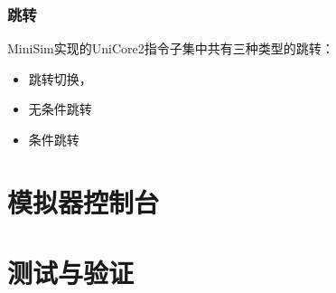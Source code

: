 \documentclass[12pt,a4paper,Flow]{report}
\begin{document}
\subsection{跳转}
MiniSim实现的UniCore2指令子集中共有三种类型的跳转：
\begin{itemize}
\item 跳转切换，
\item 无条件跳转
\item 条件跳转
\end{itemize}
\chapter{模拟器控制台}

\chapter{测试与验证}
\end{document}
